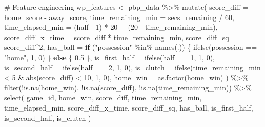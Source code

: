 \documentclass[
  letterpaper,
  DIV=11,
  numbers=noendperiod]{scrartcl}
\newenvironment{Shaded}{\begin{snugshade}}{\end{snugshade}}
\newcommand{\AttributeTok}[1]{\textcolor[rgb]{0.40,0.45,0.13}{#1}}
\newcommand{\CommentTok}[1]{\textcolor[rgb]{0.37,0.37,0.37}{#1}}
\newcommand{\ControlFlowTok}[1]{\textcolor[rgb]{0.00,0.23,0.31}{\textbf{#1}}}
\newcommand{\DecValTok}[1]{\textcolor[rgb]{0.68,0.00,0.00}{#1}}
\newcommand{\FloatTok}[1]{\textcolor[rgb]{0.68,0.00,0.00}{#1}}
\newcommand{\FunctionTok}[1]{\textcolor[rgb]{0.28,0.35,0.67}{#1}}
\newcommand{\NormalTok}[1]{\textcolor[rgb]{0.00,0.23,0.31}{#1}}
\newcommand{\OtherTok}[1]{\textcolor[rgb]{0.00,0.23,0.31}{#1}}
\newcommand{\SpecialCharTok}[1]{\textcolor[rgb]{0.37,0.37,0.37}{#1}}
\newcommand{\StringTok}[1]{\textcolor[rgb]{0.13,0.47,0.30}{#1}}
\begin{document}
\begin{Shaded}
\begin{Highlighting}[]
\CommentTok{\# Feature engineering}
\NormalTok{wp\_features }\OtherTok{\textless{}{-}}\NormalTok{ pbp\_data }\SpecialCharTok{\%\textgreater{}\%}
  \FunctionTok{mutate}\NormalTok{(}
    \AttributeTok{score\_diff =}\NormalTok{ home\_score }\SpecialCharTok{{-}}\NormalTok{ away\_score,}
    \AttributeTok{time\_remaining\_min =}\NormalTok{ secs\_remaining }\SpecialCharTok{/} \DecValTok{60}\NormalTok{,}
    \AttributeTok{time\_elapsed\_min =}\NormalTok{ (half }\SpecialCharTok{{-}} \DecValTok{1}\NormalTok{) }\SpecialCharTok{*} \DecValTok{20} \SpecialCharTok{+}\NormalTok{ (}\DecValTok{20} \SpecialCharTok{{-}}\NormalTok{ time\_remaining\_min),}
    \AttributeTok{score\_diff\_x\_time =}\NormalTok{ score\_diff }\SpecialCharTok{*}\NormalTok{ time\_remaining\_min,}
    \AttributeTok{score\_diff\_sq =}\NormalTok{ score\_diff}\SpecialCharTok{\^{}}\DecValTok{2}\NormalTok{,}
    \AttributeTok{has\_ball =} \ControlFlowTok{if}\NormalTok{ (}\StringTok{"possession"} \SpecialCharTok{\%in\%} \FunctionTok{names}\NormalTok{(.)) \{}
      \FunctionTok{ifelse}\NormalTok{(possession }\SpecialCharTok{==} \StringTok{"home"}\NormalTok{, }\DecValTok{1}\NormalTok{, }\DecValTok{0}\NormalTok{)}
\NormalTok{    \} }\ControlFlowTok{else}\NormalTok{ \{}
      \FloatTok{0.5}
\NormalTok{    \},}
    \AttributeTok{is\_first\_half =} \FunctionTok{ifelse}\NormalTok{(half }\SpecialCharTok{==} \DecValTok{1}\NormalTok{, }\DecValTok{1}\NormalTok{, }\DecValTok{0}\NormalTok{),}
    \AttributeTok{is\_second\_half =} \FunctionTok{ifelse}\NormalTok{(half }\SpecialCharTok{==} \DecValTok{2}\NormalTok{, }\DecValTok{1}\NormalTok{, }\DecValTok{0}\NormalTok{),}
    \AttributeTok{is\_clutch =} \FunctionTok{ifelse}\NormalTok{(time\_remaining\_min }\SpecialCharTok{\textless{}} \DecValTok{5} \SpecialCharTok{\&} \FunctionTok{abs}\NormalTok{(score\_diff) }\SpecialCharTok{\textless{}} \DecValTok{10}\NormalTok{, }\DecValTok{1}\NormalTok{, }\DecValTok{0}\NormalTok{),}
    \AttributeTok{home\_win =} \FunctionTok{as.factor}\NormalTok{(home\_win)}
\NormalTok{  ) }\SpecialCharTok{\%\textgreater{}\%}
  \FunctionTok{filter}\NormalTok{(}\SpecialCharTok{!}\FunctionTok{is.na}\NormalTok{(home\_win), }\SpecialCharTok{!}\FunctionTok{is.na}\NormalTok{(score\_diff), }\SpecialCharTok{!}\FunctionTok{is.na}\NormalTok{(time\_remaining\_min)) }\SpecialCharTok{\%\textgreater{}\%}
  \FunctionTok{select}\NormalTok{(}
\NormalTok{    game\_id, home\_win, score\_diff, time\_remaining\_min, time\_elapsed\_min,}
\NormalTok{    score\_diff\_x\_time, score\_diff\_sq, has\_ball, is\_first\_half,}
\NormalTok{    is\_second\_half, is\_clutch}
\NormalTok{  )}



\end{Highlighting}
\end{Shaded}
\end{document}

